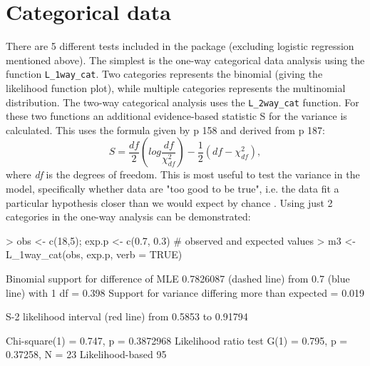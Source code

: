 \section{Categorical data}
There are 5 different tests included in the package (excluding logistic regression mentioned above). The simplest is the one-way categorical data analysis using the function \texttt{L\_1way\_cat}. Two categories represents the binomial (giving the likelihood function plot), while multiple categories represents the multinomial distribution. The two-way categorical analysis uses the \texttt{L\_2way\_cat} function. For these two functions an additional evidence-based statistic S for the variance is calculated. This uses the formula given by \citet{Cahusac:2020} p 158 and derived from \citet{Edwards:1992} p 187:\\
\begin{equation} \label{eqn}
S = \frac{df}{2} \left( log \frac{df}{\chi_{df}^{2}} \right) - \frac{1}{2}(df - \chi_{df}^{2}),
	\end{equation}
where \emph{df} is the degrees of freedom. This is most useful to test the variance in the model, specifically whether data are "too good to be true", i.e. the data fit a particular hypothesis closer than we would expect by chance \citep{Edwards:1986}. Using just 2 categories in the one-way analysis can be demonstrated:\\
\begin{example}
> obs <- c(18,5); exp.p <- c(0.7, 0.3)  # observed and expected values
> m3 <- L_1way_cat(obs, exp.p, verb = TRUE)

Binomial support for difference of MLE 0.7826087 (dashed line) 
 from 0.7 (blue line) with 1 df = 0.398
 Support for variance differing more than expected = 0.019

 S-2 likelihood interval (red line) from 0.5853 to 0.91794

Chi-square(1) = 0.747,  p = 0.3872968
 Likelihood ratio test G(1) = 0.795, p = 0.37258, N = 23
 Likelihood-based 95%
\end{example}

